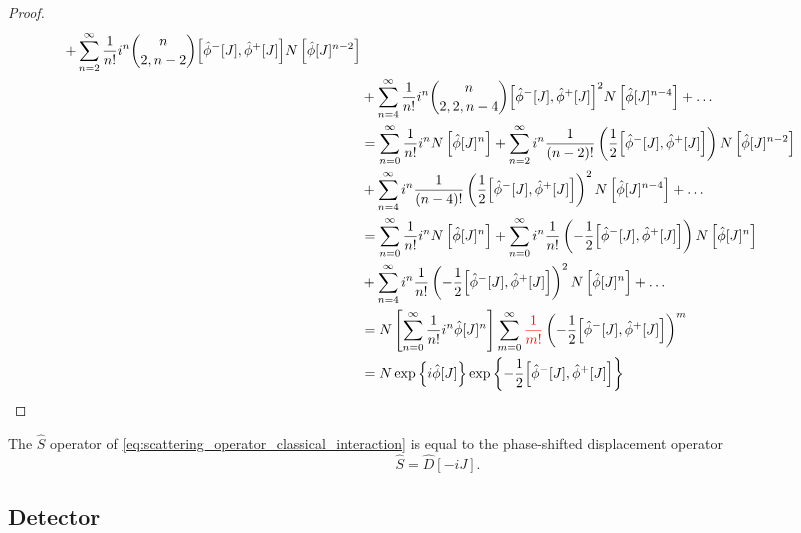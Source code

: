 \begin{proof}
\begin{equation*}
\begin{split}
			+
			\sum_{n=2}^\infty
			\frac{1}{n!}
			i^n
			\binom{n}{2,n-2}
			\comm{\hat\phi^-[J]}{\hat\phi^+[J]}
			N\left[\hat\phi[J]^{n-2}\right]
			\\
			&+
			\sum_{n=4}^\infty
			\frac{1}{n!}
			i^n
			\binom{n}{2,2,n-4}
			\comm{\hat\phi^-[J]}{\hat\phi^+[J]}^2
			N\left[\hat\phi[J]^{n-4}\right]
			+
			\dots
			\\
			&=
			\sum_{n=0}^\infty
			\frac{1}{n!}
			i^n
			N\left[\hat\phi[J]^n\right]
			+
			\sum_{n=2}^\infty
			i^n
			\frac{1}{(n-2)!}
			\left(
				\frac{1}{2}
				\comm{\hat\phi^-[J]}{\hat\phi^+[J]}
			\right)
			N\left[\hat\phi[J]^{n-2}\right]
			\\
			&+
			\sum_{n=4}^\infty
			i^n
			\frac{1}{(n-4)!}
			\left(
				\frac{1}{2}
				\comm{\hat\phi^-[J]}{\hat\phi^+[J]}
			\right)^2
			N\left[\hat\phi[J]^{n-4}\right]
			+
			\dots
			\\
			&=
			\sum_{n=0}^\infty
			\frac{1}{n!}
			i^n
			N\left[\hat\phi[J]^n\right]
			+
			\sum_{n=0}^\infty
			i^n
			\frac{1}{n!}
			\left(
				-
				\frac{1}{2}
				\comm{\hat\phi^-[J]}{\hat\phi^+[J]}
			\right)
			N\left[\hat\phi[J]^n\right]
			\\
			&+
			\sum_{n=4}^\infty
			i^n
			\frac{1}{n!}
			\left(
				-
				\frac{1}{2}
				\comm{\hat\phi^-[J]}{\hat\phi^+[J]}
			\right)^2
			N\left[\hat\phi[J]^n\right]
			+
			\dots
			\\
			&=
			N\left[
				\sum_{n=0}^\infty
				\frac{1}{n!}
				i^n
				\hat\phi[J]^n
			\right]
			\sum_{m=0}^\infty
			\textcolor{red}{\frac{1}{m!}}
			\left(
				-
				\frac{1}{2}
				\comm{\hat\phi^-[J]}{\hat\phi^+[J]}
			\right)^m
			\\
			&=
			N\exp\left\{
				i
				\hat\phi[J]
			\right\}
			\exp\left\{
				-
				\frac{1}{2}
				\comm{\hat\phi^-[J]}{\hat\phi^+[J]}
			\right\}
		\end{split}
	\end{equation*}
\end{proof}
\begin{theorem}\label{thm:displacement_scattering_operator_equivalence}
	The $\hat{S}$ operator of \cref{eq:scattering_operator_classical_interaction} is equal to the phase-shifted displacement operator
	\begin{equation}
		\hat{S}
		=
		\hat{D}[-iJ]
		.
	\end{equation}
\end{theorem}

\subsection{Detector}

